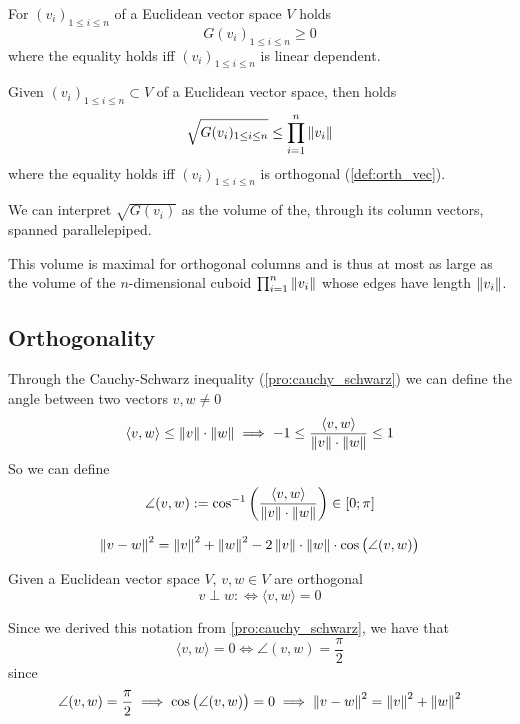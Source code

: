 \begin{proposition}
   For \((v_i)_{1 \leq i \leq n}\) of a Euclidean vector space \(V\) holds
   \[G(v_i)_{1 \leq i \leq n} \geq 0\]
   where the equality holds iff \((v_i)_{1 \leq i \leq n}\) is linear dependent.
\end{proposition}

\begin{proposition}
   Given \((v_i)_{1 \leq i \leq n} \subset V\) of a Euclidean vector space, then holds
   \[\sqrt{G(v_i)_{1 \leq i \leq n}} \leq \prod_{i=1}^n \left\lVert v_i\right\rVert\]
   where the equality holds iff \((v_i)_{1 \leq i \leq n}\) is orthogonal (\ref{def:orth_vec}).
\end{proposition}
\begin{remark}
   We can interpret \(\sqrt{G(v_i)}\) as the volume of the, through its column vectors, spanned parallelepiped.

   \begin{center}
      
   \end{center}

   This volume is maximal for orthogonal columns and is thus at most as large as the volume of the \(n\)-dimensional cuboid \(\prod_{i=1}^n \left\lVert v_i\right\rVert\) whose edges have length \(\left\lVert v_i\right\rVert\).
\end{remark}

\subsection{Orthogonality}
Through the Cauchy-Schwarz inequality (\ref{pro:cauchy_schwarz}) we can define the angle between two vectors \(v, w \neq 0\)
\[\langle v, w\rangle \leq \left\lVert v\right\rVert\cdot\left\lVert w\right\rVert \implies -1 \leq \frac{\langle v, w\rangle}{\left\lVert v\right\rVert \cdot \left\lVert w\right\rVert} \leq 1\]
So we can define
\[\angle(v, w) := \cos^{-1}\left(\frac{\langle v, w\rangle}{\left\lVert v\right\rVert \cdot \left\lVert w\right\rVert}\right) \in [0; \pi]\]

\begin{proposition}
   \[\left\lVert v - w\right\rVert^2 = \left\lVert v\right\rVert^2 + \left\lVert w\right\rVert^2 - 2\left\lVert v\right\rVert \cdot \left\lVert w\right\rVert \cdot \cos\big(\angle(v, w)\big)\]
\end{proposition}

\begin{definition}\label{def:orth_vec}
   Given a Euclidean vector space \(V\), \(v, w \in V\) are orthogonal
   \[v \perp w :\iff \langle v, w\rangle = 0\]
\end{definition}
\begin{remark}
   Since we derived this notation from \cref{pro:cauchy_schwarz}, we have that
   \[\langle v, w \rangle = 0 \iff \angle(v, w) = \frac{\pi}{2}\]
   since
   \[\angle(v, w) = \frac{\pi}{2} \implies \cos\big(\angle(v, w)\big) = 0 \implies \left\lVert v - w\right\rVert^2 = \left\lVert v\right\rVert^2 + \left\lVert w\right\rVert^2\]
\end{remark}

